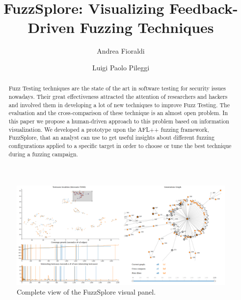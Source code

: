 \documentclass[conference,compsoc]{IEEEtran}
\begin{document}
\title{FuzzSplore: Visualizing Feedback-Driven Fuzzing Techniques}

\author[1]{Andrea Fioraldi}
\author[1]{Luigi Paolo Pileggi}

\maketitle

\begin{figure}[t]
\centering
\includegraphics[width=1.0\textwidth]{img/full}
\caption{Complete view of the {\sc FuzzSplore} visual panel.}
\label{fig:full}
\end{figure}

\begin{abstract}
Fuzz Testing techniques are the state of the art in software testing for security issues nowadays.
Their great effectiveness attracted the attention of researchers and hackers and involved them in developing a lot of new techniques to improve Fuzz Testing.
The evaluation and the cross-comparison of these technique is an almost open problem. In this paper we propose a human-driven approach to this problem based on information visualization.
We developed a prototype upon the {\sc AFL++} fuzzing framework, {\sc FuzzSplore}, that an analyst can use to get useful insights about different fuzzing configurations applied to a specific target in order to choose or tune the best technique during a fuzzing campaign.
\end{abstract}
\end{document}
